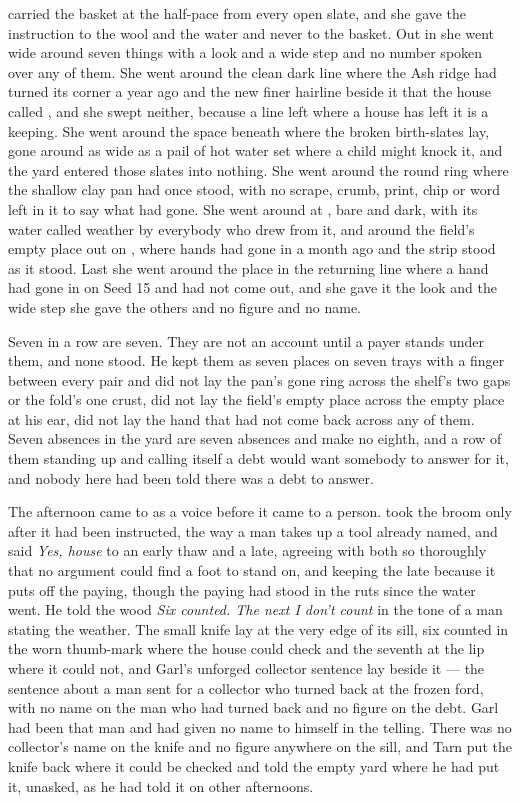  carried the basket at the half-pace from every open slate, and she gave the instruction to the wool and the water and never to the basket. Out in  she went wide around seven things with a look and a wide step and no number spoken over any of them. She went around the clean dark line where the Ash ridge had turned its corner a year ago and the new finer hairline beside it that the house called , and she swept neither, because a line left where a house has left it is a keeping. She went around the space beneath  where the broken birth-slates lay, gone around as wide as a pail of hot water set where a child might knock it, and the yard entered those slates into nothing. She went around the round ring where the shallow clay pan had once stood, with no scrape, crumb, print, chip or word left in it to say what had gone. She went around  at , bare and dark, with its water called weather by everybody who drew from it, and around the field's empty place out on , where hands had gone in a month ago and the strip stood as it stood. Last she went around the place in the returning line where a hand had gone in on Seed 15 and had not come out, and she gave it the look and the wide step she gave the others and no figure and no name.

Seven in a row are seven. They are not an account until a payer stands under them, and none stood. He kept them as seven places on seven trays with a finger between every pair and did not lay the pan's gone ring across the shelf's two gaps or the fold's one crust, did not lay the field's empty place across the empty place at his ear, did not lay the hand that had not come back across any of them. Seven absences in the yard are seven absences and make no eighth, and a row of them standing up and calling itself a debt would want somebody to answer for it, and nobody here had been told there was a debt to answer.

\scenebreak

The afternoon came to  as a voice before it came to a person.  took the broom only after it had been instructed, the way a man takes up a tool already named, and said \emph{Yes, house} to an early thaw and a late, agreeing with both so thoroughly that no argument could find a foot to stand on, and keeping the late because it puts off the paying, though the paying had stood in the ruts since the water went. He told the wood \emph{Six counted. The next I don't count} in the tone of a man stating the weather. The small knife lay at the very edge of its sill, six counted in the worn thumb-mark where the house could check and the seventh at the lip where it could not, and Garl's unforged collector sentence lay beside it --- the sentence about a man sent for a collector who turned back at the frozen ford, with no name on the man who had turned back and no figure on the debt. Garl had been that man and had given no name to himself in the telling. There was no collector's name on the knife and no figure anywhere on the sill, and Tarn put the knife back where it could be checked and told the empty yard where he had put it, unasked, as he had told it on other afternoons.


